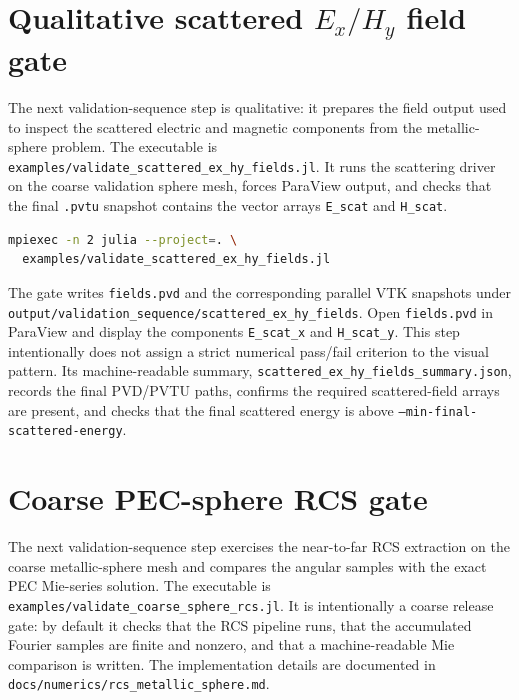\documentclass[11pt,oneside]{book}
\newcommand{\code}[1]{\texttt{#1}}
\begin{document}
\section{Qualitative scattered \texorpdfstring{$E_x/H_y$}{Ex/Hy} field gate}

The next validation-sequence step is qualitative: it prepares the field output
used to inspect the scattered electric and magnetic components from the
metallic-sphere problem. The executable is
\code{examples/validate\_scattered\_ex\_hy\_fields.jl}. It runs the scattering
driver on the coarse validation sphere mesh, forces ParaView output, and checks
that the final \code{.pvtu} snapshot contains the vector arrays
\code{E\_scat} and \code{H\_scat}.

\begin{lstlisting}[language=bash]
mpiexec -n 2 julia --project=. \
  examples/validate_scattered_ex_hy_fields.jl
\end{lstlisting}

The gate writes \code{fields.pvd} and the corresponding parallel VTK snapshots
under \code{output/validation\_sequence/scattered\_ex\_hy\_fields}. Open
\code{fields.pvd} in ParaView and display the components
\code{E\_scat\_x} and \code{H\_scat\_y}. This step intentionally does not
assign a strict numerical pass/fail criterion to the visual pattern. Its
machine-readable summary,
\code{scattered\_ex\_hy\_fields\_summary.json}, records the final PVD/PVTU
paths, confirms the required scattered-field arrays are present, and checks
that the final scattered energy is above \code{--min-final-scattered-energy}.

\section{Coarse PEC-sphere RCS gate}

The next validation-sequence step exercises the near-to-far RCS extraction on
the coarse metallic-sphere mesh and compares the angular samples with the exact
PEC Mie-series solution. The executable is
\code{examples/validate\_coarse\_sphere\_rcs.jl}. It is intentionally a coarse
release gate: by default it checks that the RCS pipeline runs, that the
accumulated Fourier samples are finite and nonzero, and that a
machine-readable Mie comparison is written.
The implementation details are documented in
\code{docs/numerics/rcs\_metallic\_sphere.md}.
\end{document}
